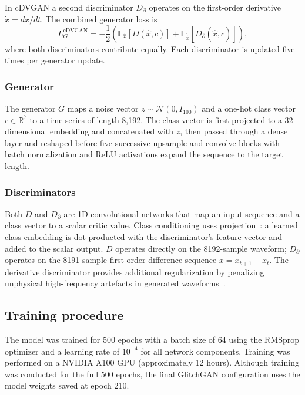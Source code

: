 \documentclass[reprint,nofootinbib,amsmath,amssymb,aps,floatfix]{revtex4-2}
\begin{document}
In cDVGAN a second discriminator $D_\partial$ operates on the first-order derivative $\dot{x} = dx/dt$.
The combined generator loss is
\begin{equation}\label{eq:combined_loss}
    L_G^{\text{cDVGAN}} = -\frac{1}{2}\left(\mathbb{E}_{\hat{x}}[D(\hat{x},c)] + \mathbb{E}_{\dot{\hat{x}}}[D_\partial(\dot{\hat{x}},c)]\right),
\end{equation}
where both discriminators contribute equally.
Each discriminator is updated five times per generator update.

\subsubsection{Generator}

The generator $G$ maps a noise vector $z \sim \mathcal{N}(0, I_{100})$ and a one-hot class vector $c \in \mathbb{R}^7$ to a time series of length 8,192.
The class vector is first projected to a 32-dimensional embedding and concatenated with $z$, then passed through a dense layer and reshaped before five successive upsample-and-convolve blocks with batch normalization and ReLU activations expand the sequence to the target length.

\subsubsection{Discriminators}

Both $D$ and $D_\partial$ are 1D convolutional networks that map an input sequence and a class vector to a scalar critic value.
Class conditioning uses projection~\cite{Mirza_2014}: a learned class embedding is dot-producted with the discriminator's feature vector and added to the scalar output.
$D$ operates directly on the 8192-sample waveform; $D_\partial$ operates on the 8191-sample first-order difference sequence $\dot{x} = x_{t+1} - x_t$.
The derivative discriminator provides additional regularization by penalizing unphysical high-frequency artefacts in generated waveforms~\cite{dooney2022dvgan}.

\subsection{Training procedure}

The model was trained for 500 epochs with a batch size of 64 using the RMSprop optimizer and a learning rate of $10^{-4}$ for all network components.
Training was performed on a NVIDIA A100 GPU (approximately 12 hours).
Although training was conducted for the full 500 epochs, the final GlitchGAN configuration uses the model weights saved at epoch 210.
\end{document}
